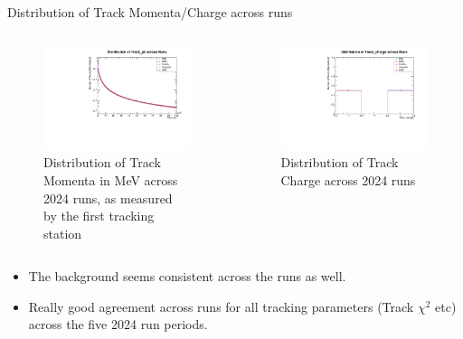 \begin{frame}{Distribution of Track Momenta/Charge across runs}
	\begin{columns}
		\begin{column}{0.5\linewidth}
			\begin{figure}
				\includegraphics[width=\linewidth]{./RunwisePlots/Track_p0_runwise.pdf}
				\caption{Distribution of Track Momenta in MeV across 2024 runs, as measured by the first tracking station}
			\end{figure}
		\end{column}
		\begin{column}{0.5\linewidth}
			\begin{figure}
				\includegraphics[width=\linewidth]{./RunwisePlots/Track_charge_runwise.pdf}
				\caption{Distribution of Track Charge across 2024 runs}
			\end{figure}
		\end{column}
	\end{columns}
	\begin{itemize}
		\item The background seems consistent across the runs as well.
		\item Really good agreement across runs for all tracking parameters (Track $\chi^{2}$ etc) across the five 2024 run periods.
	\end{itemize}
\end{frame}

